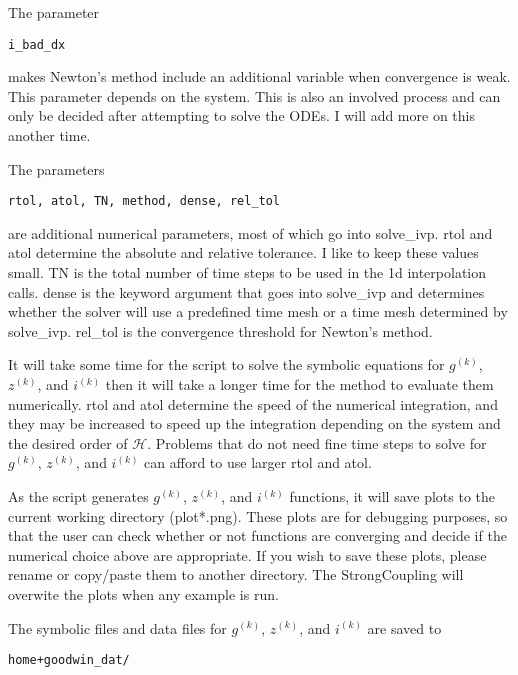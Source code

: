 \documentclass[english,a4paper,oneside]{article}
\begin{document}
The parameter

\begin{verbatim}
i_bad_dx
\end{verbatim}

makes Newton's method include an additional variable when convergence is
weak. This parameter depends on the system. This is also an involved
process and can only be decided after attempting to solve the ODEs. I
will add more on this another time.

The parameters

\begin{verbatim}
rtol, atol, TN, method, dense, rel_tol
\end{verbatim}

are additional numerical parameters, most of which go into solve\_ivp.
rtol and atol determine the absolute and relative tolerance. I like to
keep these values small. TN is the total number of time steps to be used
in the 1d interpolation calls. dense is the keyword argument that goes
into solve\_ivp and determines whether the solver will use a predefined
time mesh or a time mesh determined by solve\_ivp. rel\_tol is the
convergence threshold for Newton's method.

It will take some time for the script to solve the symbolic equations
for \(g^{(k)}\), \(z^{(k)}\), and \(i^{(k)}\) then it will take a longer
time for the method to evaluate them numerically. rtol and atol
determine the speed of the numerical integration, and they may be
increased to speed up the integration depending on the system and the
desired order of \(\mathcal{H}\). Problems that do not need fine time
steps to solve for \(g^{(k)}\), \(z^{(k)}\), and \(i^{(k)}\) can afford
to use larger rtol and atol.

As the script generates \(g^{(k)}\), \(z^{(k)}\), and \(i^{(k)}\)
functions, it will save plots to the current working directory
(plot*.png). These plots are for debugging purposes, so that the user
can check whether or not functions are converging and decide if the
numerical choice above are appropriate. If you wish to save these plots,
please rename or copy/paste them to another directory. The
StrongCoupling will overwite the plots when any example is run.

The symbolic files and data files for \(g^{(k)}\), \(z^{(k)}\), and
\(i^{(k)}\) are saved to

\begin{verbatim}
home+goodwin_dat/
\end{verbatim}
\end{document}
